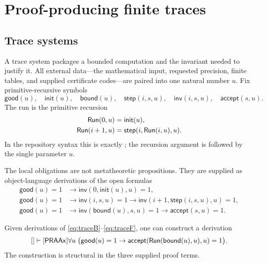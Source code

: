 \section{Proof-producing finite traces}
\label{sec:trace}

\subsection{Trace systems}

A trace system packages a bounded computation and the invariant needed to
justify it.  All external data---the mathematical input, requested precision,
finite tables, and supplied certificate codes---are paired into one natural
number \(u\).  Fix primitive-recursive symbols
\[
 \mathsf{good}(u),\quad \mathsf{init}(u),\quad \mathsf{bound}(u),
 \quad \mathsf{step}(i,s,u),\quad \mathsf{inv}(i,s,u),
 \quad \mathsf{accept}(s,u).
\]
The run is the primitive recursion
\begin{align*}
 \mathsf{Run}(0,u)&=\mathsf{init}(u),\\
 \mathsf{Run}(i+1,u)&=\mathsf{step}(i,\mathsf{Run}(i,u),u).
\end{align*}
In the repository syntax this is exactly
; the recursion argument is followed by the single
parameter \(u\).

The local obligations are not metatheoretic propositions.  They are supplied
as object-language derivations of the open formulas
\begin{align}
 \mathsf{good}(u)=1&\to
   \mathsf{inv}(0,\mathsf{init}(u),u)=1,
   \tag{B}\label{eq:traceB}\\
 \mathsf{good}(u)=1&\to
   \mathsf{inv}(i,s,u)=1\to
   \mathsf{inv}(i+1,\mathsf{step}(i,s,u),u)=1,
   \tag{S}\label{eq:traceS}\\
 \mathsf{good}(u)=1&\to
   \mathsf{inv}(\mathsf{bound}(u),s,u)=1\to
   \mathsf{accept}(s,u)=1.
   \tag{F}\label{eq:traceF}
\end{align}

\begin{theorem}
\label{thm:trace-reflection}
Given derivations of \eqref{eq:traceB}--\eqref{eq:traceF}, one can construct a
derivation
\[
 []\vdash[\mathsf{PRAAx}]\forall u\;
 \bigl(\mathsf{good}(u)=1\to
 \mathsf{accept}(\mathsf{Run}(\mathsf{bound}(u),u),u)=1\bigr).
\]
The construction is structural in the three supplied proof terms.
\end{theorem}

